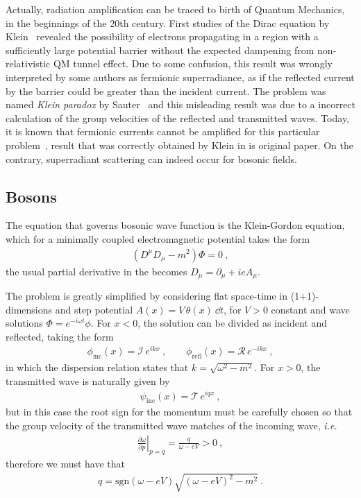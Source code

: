 Actually, radiation amplification can be traced to birth of Quantum Mechanics, in the beginnings of the 20th century. 
First studies of the Dirac equation by Klein~\cite{Klein1929} revealed the possibility of electrons propagating in a region with a sufficiently large potential barrier without the expected dampening from non-relativistic QM tunnel effect.
Due to some confusion, this result was wrongly interpreted by some authors as fermionic superradiance, as if the reflected current by the barrier could be greater than the incident current. 
The problem was named \emph{Klein paradox} by Sauter~\cite{Sauter1931} and this misleading result was due to a incorrect calculation of the group velocities of the reflected and transmitted waves. 
Today, it is known that fermionic currents cannot be amplified for this particular problem~\cite{Manogue1988}, result that was correctly obtained by Klein in is original paper. 
On the contrary, superradiant scattering can indeed occur for bosonic fields.

\subsection{Bosons}

The equation that governs bosonic wave function is the Klein-Gordon equation, which for a minimally coupled electromagnetic potential takes the form
\begin{align}
    (D^\mu D_\mu - m^2) \Phi = 0 ~,
\end{align}
the usual partial derivative in the becomes $D_\mu = \partial_\mu + i e A_\mu$. 

The problem is greatly simplified by considering flat space-time in (1+1)-dimensions and step potential $A(x) = V\,\theta(x) ~\dd t$, for $V>0$ constant and wave solutions $\Phi= e^{-i \omega t} \phi$.
For $x<0$, the solution can be divided as incident and reflected, taking the form
\begin{align}
    \phi_\mathrm{inc}(x) = \mathcal{I}\, e^{i k x}  ~, \qquad
    \phi_\mathrm{refl}(x) = \mathcal{R}\, e^{- i k x} ~,
\end{align}
in which the dispersion relation states that $k=\sqrt{\omega^2-m^2}$. For $x>0$, the transmitted wave is naturally given by 
\begin{align}
    \psi_\mathrm{inc}(x) = \mathcal{T}\, e^{i q x}  ~,
\end{align}
but in this case the root sign for the momentum must be carefully chosen so that the group velocity of the transmitted wave matches of the incoming wave, \textit{i.e.}
\begin{align}
    \left.\frac{\partial \omega}{\partial p}\right|_{p=q} = \frac{q}{\omega - e V} > 0 ~,
\end{align}
therefore we must have that
\begin{align}
    q = \mathrm{sgn}(\omega - e V) \sqrt{ (\omega - e V)^2 - m^2 } ~.
\end{align}

